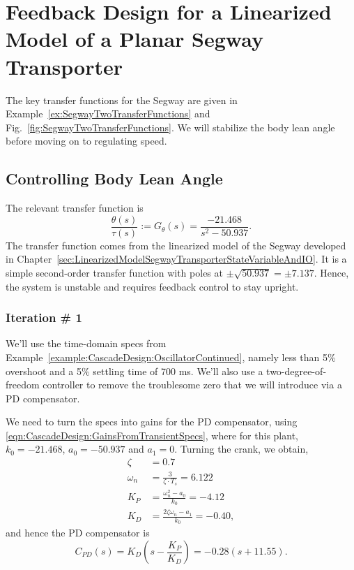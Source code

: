  \section{Feedback Design for a Linearized Model of a Planar Segway Transporter}

 The key transfer functions for the Segway are given in Example~\ref{ex:SegwayTwoTransferFunctions} and Fig.~\ref{fig:SegwayTwoTransferFunctions}. We will stabilize the body lean angle before moving on to regulating speed.

 \subsection{Controlling Body Lean Angle}

 The relevant transfer function is
 \begin{equation}
      \frac{\theta(s)}{\tau(s)} := G_\theta(s) = \frac{-21.468}{s^2 - 50.937 }.
 \end{equation}
 The transfer function comes from the linearized model of the Segway developed in Chapter~\ref{sec:LinearizedModelSegwayTransporterStateVariableAndIO}. It is a simple second-order transfer function with poles at $\pm \sqrt{50.937} = \pm 7.137$. Hence, the system is unstable and requires feedback control to stay upright. \\

 \subsubsection{Iteration \# 1}

 We'll use the time-domain specs from Example~\ref{example:CascadeDesign:OscillatorContinued}, namely less than 5\% overshoot and a 5\% settling time of 700 ms. We'll also use a two-degree-of-freedom controller to remove the troublesome zero that we will introduce via a PD compensator.

 We need to turn the specs into gains for the PD compensator, using \eqref{eqn:CascadeDesign:GainsFromTransientSpecs}, where for this plant, $k_0 = -21.468$, $a_0 = -50.937$ and $a_1=0$. Turning the crank, we obtain,
\begin{align*}
\zeta & = 0.7 \\
\omega_n & = \frac{3}{\zeta \cdot T_s} =  6.122 \\
   K_P&= \frac{\omega_n^2 - a_0}{k_0} = -4.12\\
K_D&= \frac{2 \zeta \omega_n - a_1}{k_0} = -0.40,
\end{align*}
and hence the PD compensator is
$$ C_{PD}(s) = K_D \left( s - \frac{K_P}{K_D} \right) = -0.28 ( s +  11.55).$$

